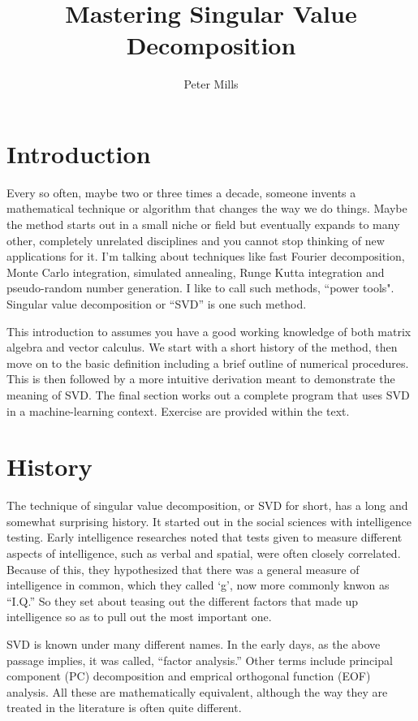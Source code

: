 \documentclass{article}
\begin{document}
\title{Mastering Singular Value Decomposition}

\author{Peter Mills}

\maketitle

\section{Introduction}

Every so often, maybe two or three times a decade, someone invents a 
mathematical technique or algorithm that changes the way we do things.
Maybe the method starts out in a small niche or field but eventually expands
to many other, completely unrelated disciplines and you cannot stop thinking
of new applications for it.
I'm talking about techniques like fast Fourier decomposition,
Monte Carlo integration, simulated annealing, Runge Kutta integration
and pseudo-random number generation.
I like to call such methods, ``power tools".
Singular value decomposition or ``SVD'' is one such method.

This introduction to assumes you have a good working knowledge of 
both matrix algebra and vector calculus.
We start with a short history of the method, then move on to the basic 
definition including a brief outline of numerical procedures.
This is then followed by a more intuitive derivation meant to demonstrate
the meaning of SVD.
The final section works out a complete program that uses SVD in a machine-learning
context.
Exercise are provided within the text.

\section{History}

The technique of singular value decomposition, or SVD for short, has a long
and somewhat surprising history.
It started out in the social sciences with intelligence testing.
Early intelligence researches noted that tests given to measure different
aspects of intelligence, such as verbal and spatial, were often closely
correlated.
Because of this, they hypothesized that there was a general measure of 
intelligence in common, which they called `g', now more commonly knwon
as ``I.Q.''
So they set about teasing out the different factors that made up intelligence
so as to pull out the most important one.

SVD is known under many different names.
In the early days, as the above passage implies, it was called, ``factor
analysis.''
Other terms include principal component (PC) decomposition and 
emprical orthogonal function (EOF) analysis.
All these are mathematically equivalent, although the way they are treated
in the literature is often quite different.
\end{document}
